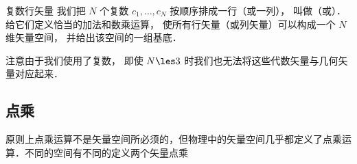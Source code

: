 \begin{exer}{复数行矢量}
我们把 $N$ 个复数 $c_1, \dots, c_N$ 按顺序排成一行（或一列）， 叫做（或）． 给它们定义恰当的加法和数乘运算， 使所有行矢量（或列矢量）可以构成一个 $N$ 维矢量空间， 并给出该空间的一组基底．

注意由于我们使用了复数， 即使 $N \les 3$ 时我们也无法将这些代数矢量与几何矢量对应起来．
\end{exer}

\subsection{点乘}
原则上点乘运算不是矢量空间所必须的，但物理中的矢量空间几乎都定义了点乘运算．不同的空间有不同的定义两个矢量点乘

